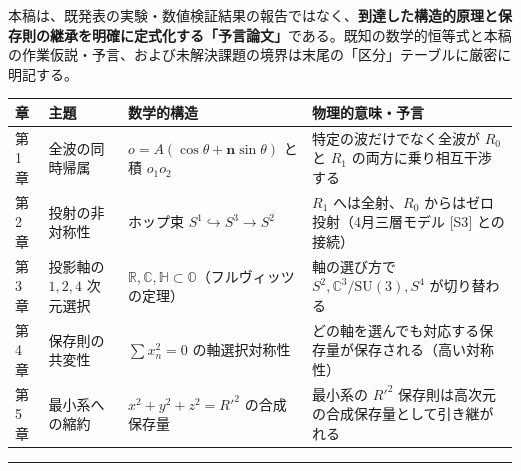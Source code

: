 \documentclass[
  a4paper,
]{ltjsarticle}
\newcounter{none} %
\begin{document}
本稿は、既発表の実験・数値検証結果の報告ではなく、\textbf{到達した構造的原理と保存則の継承を明確に定式化する「予言論文」}である。既知の数学的恒等式と本稿の作業仮説・予言、および未解決課題の境界は末尾の「区分」テーブルに厳密に明記する。

{\def\LTcaptype{none} %
\begin{longtable}[]{@{}
  >{\raggedright\arraybackslash}p{}
  >{\raggedright\arraybackslash}p{}
  >{\raggedright\arraybackslash}p{}
  >{\raggedright\arraybackslash}p{}@{}}
\toprule\noalign{}
\begin{minipage}[b]{\linewidth}\raggedright
章
\end{minipage} & \begin{minipage}[b]{\linewidth}\raggedright
主題
\end{minipage} & \begin{minipage}[b]{\linewidth}\raggedright
数学的構造
\end{minipage} & \begin{minipage}[b]{\linewidth}\raggedright
物理的意味・予言
\end{minipage} \\
\midrule\noalign{}
\endhead
\bottomrule\noalign{}
\endlastfoot
第1章 & 全波の同時帰属 & \(o = A(\cos\theta + \mathbf{n}\sin\theta)\)
と積 \(o_1 o_2\) & 特定の波だけでなく全波が \(R_0\) と \(R_1\)
の両方に乗り相互干渉する \\
第2章 & 投射の非対称性 & ホップ束 \(S^1 \hookrightarrow S^3 \to S^2\) &
\(R_1\) へは全射、\(R_0\) からはゼロ投射（4月三層モデル {[}S3{]}
との接続） \\
第3章 & 投影軸の \(1, 2, 4\) 次元選択 &
\(\mathbb{R}, \mathbb{C}, \mathbb{H} \subset \mathbb{O}\)（フルヴィッツの定理）
& 軸の選び方で \(S^2, \mathbb{C}^3/\mathrm{SU}(3), S^4\) が切り替わる \\
第4章 & 保存則の共変性 & \(\sum x_n^2 = 0\) の軸選択対称性 &
どの軸を選んでも対応する保存量が保存される（高い対称性） \\
第5章 & 最小系への縮約 & \(x^2+y^2+z^2=R'^2\) の合成保存量 & 最小系の
\(R'^2\) 保存則は高次元の合成保存量として引き継がれる \\
\end{longtable}
}

\begin{center}\rule{0.5\linewidth}{0.5pt}\end{center}
\end{document}
